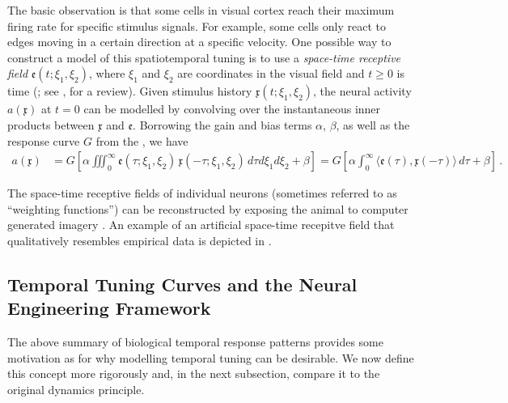 The basic observation is that some cells in visual cortex reach their maximum firing rate for specific stimulus signals.
For example, some cells only react to edges moving in a certain direction at a specific velocity.
One possible way to construct a model of this spatiotemporal tuning is to use a \emph{space-time receptive field} $\mathfrak{e}(t; \xi_1, \xi_2)$, where $\xi_1$ and $\xi_2$ are coordinates in the visual field and $t \geq 0$ is time (\cite{watson1983look,adelson1985spatiotemporal}; see \cite{carandini1999linearity}, for a review).
Given stimulus history $\mathfrak{x}(t; \xi_1, \xi_2)$, the neural activity $a(\mathfrak{x})$ at $t = 0$ can be modelled by convolving over the instantaneous inner products between $\mathfrak{x}$ and $\mathfrak{e}$.
Borrowing the gain and bias terms $\alpha$, $\beta$, as well as the response curve $G$ from the \NEF, we have
\begin{align}
	a(\mathfrak{x})
		&= G\left[\alpha \! \iiint_0^\infty \!\!\! \mathfrak{e}(\tau; \xi_1, \xi_2) \, \mathfrak{x}(-\tau; \xi_1, \xi_2) \,
		\mathit{d \tau} \mathit{d \xi_1} \mathit{d \xi_2} + \beta \right]
		 = G\left[\alpha \! \int_0^\infty \!\!\! \big\langle \mathfrak{e}(\tau), \mathfrak{x}(-\tau) \big\rangle \,
		 \mathit{d \tau} + \beta \right] \, .
	\label{eqn:tuning_curve_from_temporal_receptive_field}
\end{align}

The space-time receptive fields of individual neurons (sometimes referred to as \enquote{weighting functions}) can be reconstructed by exposing the animal to computer generated imagery \citep{mclean1989contribution}.
An example of an artificial space-time recepitve field that qualitatively resembles empirical data \citep[cf.][]{deangelis1993spatiotemporal} is depicted in .

\subsection{Temporal Tuning Curves and the Neural Engineering Framework}
\label{sec:temporal_tuning_nef}

The above summary of biological temporal response patterns provides some motivation as for why modelling temporal tuning can be desirable.
We now define this concept more rigorously and, in the next subsection, compare it to the original \NEF dynamics principle.

